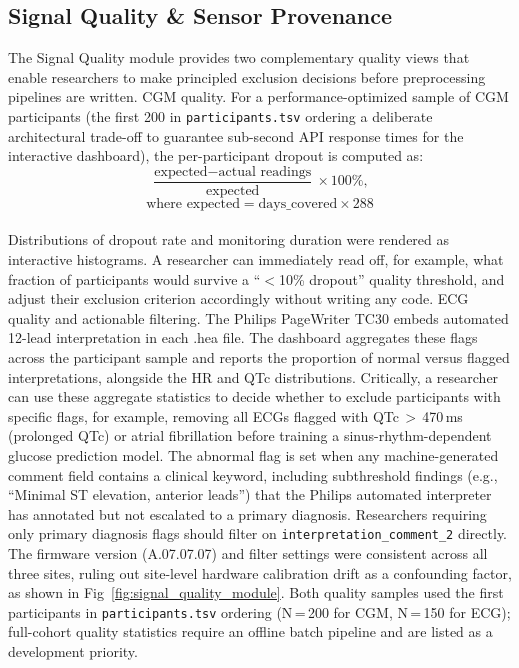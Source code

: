 \documentclass[conference]{IEEEtran}
\begin{document}
\subsection{Signal Quality \& Sensor Provenance}
The Signal Quality module provides two complementary quality views that enable researchers to make principled exclusion decisions before preprocessing pipelines are written.
CGM quality. For a performance-optimized sample of CGM participants (the first 200 in \texttt{participants.tsv} ordering a deliberate architectural trade-off to guarantee sub-second API response times for the interactive dashboard), the per-participant dropout is computed as:
\begin{equation}
    \frac{\text{expected} - \text{actual readings}}{\text{expected}} \times 100\%, 
\end{equation}
$$\text{where } \text{expected} = \text{days\_covered} \times 288$$ \\ 
Distributions of dropout rate and monitoring duration were rendered as interactive histograms. A researcher can immediately read off, for example, what fraction of participants would survive a “$<$10\% dropout” quality threshold, and adjust their exclusion criterion accordingly without writing any code.
ECG quality and actionable filtering. The Philips PageWriter TC30 \cite{philips_tc30_manual} embeds automated 12-lead interpretation in each .hea file. The dashboard aggregates these flags across the participant sample and reports the proportion of normal versus flagged interpretations, alongside the HR and QTc distributions. Critically, a researcher can use these aggregate statistics to decide whether to exclude participants with specific flags, for example, removing all ECGs flagged with QTc\,$>$\,470\,ms (prolonged QTc) or atrial fibrillation before training a sinus-rhythm-dependent glucose prediction model. The abnormal flag is set when any machine-generated comment field contains a clinical keyword, including
subthreshold findings (e.g., ``Minimal ST elevation, anterior leads'') that the Philips automated interpreter has annotated but not escalated to a primary diagnosis. Researchers requiring only primary diagnosis flags should filter on \texttt{interpretation\_comment\_2} directly. The firmware version (A.07.07.07) and filter settings were consistent across all three sites, ruling out site-level hardware calibration drift as a confounding factor, as shown in Fig~\ref{fig:signal_quality_module}. Both quality samples used the first participants in \texttt{participants.tsv} ordering (N\,=\,200 for CGM, N\,=\,150 for ECG); full-cohort quality statistics require an offline batch pipeline and are listed as a development priority.
\end{document}
